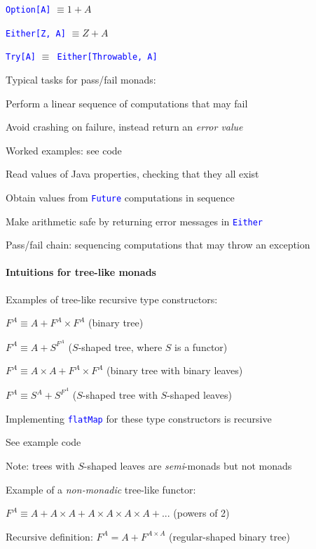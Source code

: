 \texttt{\textcolor{blue}{\footnotesize{}Option{[}A{]}}} $\equiv1+A$

\texttt{\textcolor{blue}{\footnotesize{}Either{[}Z, A{]}}} $\equiv Z+A$

\texttt{\textcolor{blue}{\footnotesize{}Try{[}A{]}}} $\equiv$\texttt{\textcolor{blue}{\footnotesize{}
Either{[}Throwable, A{]}}} 

Typical tasks for pass/fail monads:

Perform a linear sequence of computations that may fail

Avoid crashing on failure, instead return an \emph{error value}

Worked examples: see code

Read values of Java properties, checking that they all exist

Obtain values from \texttt{\textcolor{blue}{\footnotesize{}Future}}
computations in sequence

Make arithmetic safe by returning error messages in \texttt{\textcolor{blue}{\footnotesize{}Either}} 

Pass/fail chain: sequencing computations that may throw an exception


\paragraph{Intuitions for tree-like monads}

Examples of tree-like recursive type constructors:

$F^{A}\equiv A+F^{A}\times F^{A}$ (binary tree)

$F^{A}\equiv A+S^{F^{A}}$ ($S$-shaped tree, where $S$ is a functor)

$F^{A}\equiv A\times A+F^{A}\times F^{A}$ (binary tree with binary
leaves)

$F^{A}\equiv S^{A}+S^{F^{A}}$ ($S$-shaped tree with $S$-shaped
leaves)

Implementing \texttt{\textcolor{blue}{\footnotesize{}flatMap}} for
these type constructors is recursive

See example code

Note: trees with $S$-shaped leaves are \emph{semi}-monads but not
monads

Example of a \emph{non-monadic} tree-like functor:

$F^{A}\equiv A+A\times A+A\times A\times A\times A+...$ (powers of
2)

Recursive definition: $F^{A}=A+F^{A\times A}$ (regular-shaped binary
tree)


